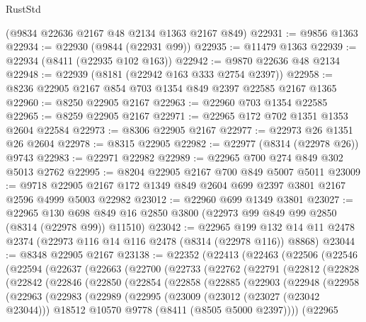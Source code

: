 \begin{lexlean}{RustStd}
\begin{coremodule}
    (@9834 @22636 @2167 @48 @2134 @1363 @2167 @849)
@22931 := @9856 @1363
@22934 := @22930 (@9844 (@22931 @99))
@22935 := @11479 @1363
@22939 := @22934 (@8411 (@22935 @102 @163))
@22942 := @9870 @22636 @48 @2134
@22948 := @22939 (@8181 (@22942 @163 @333 @2754 @2397))
@22958 := @8236 @22905 @2167 @854 @703 @1354 @849 @2397 @22585 @2167 @1365
@22960 := @8250 @22905 @2167
@22963 := @22960 @703 @1354 @22585
@22965 := @8259 @22905 @2167
@22971 := @22965 @172 @702 @1351 @1353 @2604 @22584
@22973 := @8306 @22905 @2167
@22977 := @22973 @26 @1351 @26 @2604
@22978 := @8315 @22905
@22982 := @22977 (@8314 (@22978 @26)) @9743
@22983 := @22971 @22982
@22989 := @22965 @700 @274 @849 @302 @5013 @2762
@22995 := @8204 @22905 @2167 @700 @849 @5007 @5011
@23009 := @9718 @22905 @2167 @172 @1349 @849 @2604 @699 @2397 @3801 @2167 @2596 @4999 @5003 @22982
@23012 := @22960 @699 @1349 @3801
@23027 := @22965
    @130
    @698
    @849
    @16
    @2850
    @3800
    (@22973 @99 @849 @99 @2850 (@8314 (@22978 @99)) @11510)
@23042 := @22965
    @199
    @132
    @14
    @11
    @2478
    @2374
    (@22973 @116 @14 @116 @2478 (@8314 (@22978 @116)) @8868)
@23044 := @8348 @22905 @2167
@23138 := @22352
    (@22413
      (@22463
        (@22506
          (@22546
            (@22594
              (@22637
                (@22663
                  (@22700
                    (@22733
                      (@22762
                        (@22791
                          (@22812
                            (@22828
                              (@22842
                                (@22846
                                  (@22850
                                    (@22854
                                      (@22858
                                        (@22885
                                          (@22903
                                            (@22948
                                              (@22958
                                                (@22963
                                                  (@22983
                                                    (@22989
                                                      (@22995
                                                        (@23009
                                                          (@23012 (@23027 (@23042 @23044)))
                                                          @18512
                                                          @10570
                                                          @9778
                                                          (@8411 (@8505 @5000 @2397))))
                                                      (@22965

\end{coremodule}
\end{lexlean}
